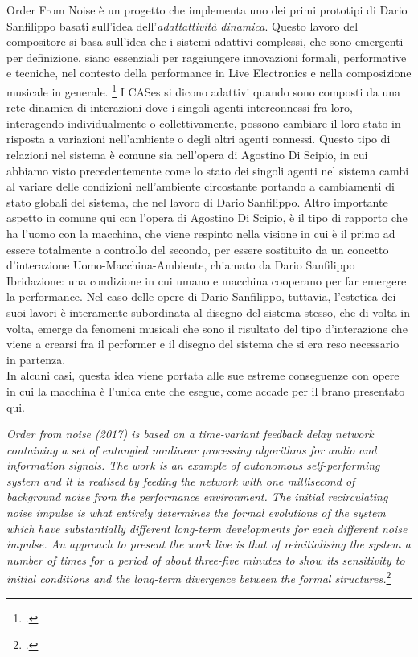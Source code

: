 Order From Noise è un progetto che implementa uno 
dei primi prototipi di Dario Sanfilippo basati sull'idea dell'\textit{adattattività dinamica}. 
Questo lavoro del compositore si basa sull'idea che i sistemi adattivi complessi, 
che sono emergenti per definizione, siano essenziali per raggiungere innovazioni formali, 
performative e tecniche, nel contesto della performance in Live Electronics e nella composizione musicale in generale. 
\footcite{sanfilippo_time-variant_2018}
I CASes si dicono adattivi quando sono composti da una rete dinamica 
di interazioni dove i singoli agenti interconnessi fra loro, interagendo individualmente
o collettivamente, possono cambiare il loro stato in risposta a variazioni nell'ambiente o
degli altri agenti connessi. 
Questo tipo di relazioni nel sistema è comune sia nell'opera di Agostino Di Scipio,
in cui abbiamo visto precedentemente come lo stato dei singoli agenti nel sistema 
cambi al variare delle condizioni nell'ambiente circostante portando a
cambiamenti di stato globali del sistema, che nel lavoro di Dario Sanfilippo.
Altro importante aspetto in comune qui con l'opera di Agostino Di Scipio,
è il tipo di rapporto che ha l'uomo con la macchina, che viene respinto nella visione in cui è il primo
ad essere totalmente a controllo del secondo, per essere sostituito da un concetto 
d'interazione Uomo-Macchina-Ambiente, chiamato da Dario Sanfilippo Ibridazione: 
una condizione in cui umano e macchina cooperano per far emergere la performance. 
Nel caso delle opere di Dario Sanfilippo, tuttavia, l'estetica dei suoi lavori è interamente subordinata
al disegno del sistema stesso, che di volta in volta, emerge da fenomeni musicali che sono il risultato
del tipo d'interazione che viene a crearsi fra il performer e il disegno del sistema che si era reso necessario
in partenza. \\
In alcuni casi, questa idea viene portata alle sue estreme conseguenze con opere in cui la macchina è l'unica 
ente che esegue, come accade per il brano presentato qui.

\begin{center}
    \vspace{0.5cm}
    \textit{Order from noise (2017) is based on a time-variant feedback delay network containing a 
    set of entangled nonlinear processing algorithms for audio and information signals. 
    The work is an example of autonomous self-performing system and it is realised by
    feeding the network with one millisecond of background noise from the performance
    environment. The initial recirculating noise impulse is what entirely determines the
    formal evolutions of the system which have substantially different long-term developments 
    for each different noise impulse. An approach to present the work live is that
    of reinitialising the system a number of times for a period of about three-five minutes
    to show its sensitivity to initial conditions and the long-term divergence between the
    formal structures.}\footcite{sanfilippo_time-variant_2018}
    \vspace{0.5cm}
\end{center}

